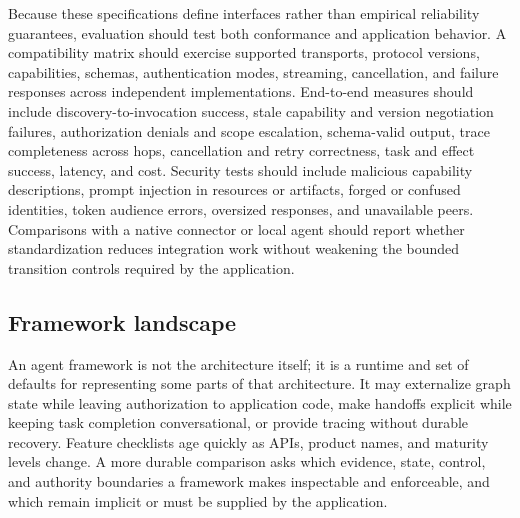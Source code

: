 Because these specifications define interfaces rather than empirical reliability guarantees, evaluation should test both conformance and application behavior. A compatibility matrix should exercise supported transports, protocol versions, capabilities, schemas, authentication modes, streaming, cancellation, and failure responses across independent implementations. End-to-end measures should include discovery-to-invocation success, stale capability and version negotiation failures, authorization denials and scope escalation, schema-valid output, trace completeness across hops, cancellation and retry correctness, task and effect success, latency, and cost. Security tests should include malicious capability descriptions, prompt injection in resources or artifacts, forged or confused identities, token audience errors, oversized responses, and unavailable peers. Comparisons with a native connector or local agent should report whether standardization reduces integration work without weakening the bounded transition controls required by the application.

\subsection{Framework landscape}
\label{sec:frameworks}

An agent framework is not the architecture itself; it is a runtime and set of defaults for representing some parts of that architecture. It may externalize graph state while leaving authorization to application code, make handoffs explicit while keeping task completion conversational, or provide tracing without durable recovery. Feature checklists age quickly as APIs, product names, and maturity levels change. A more durable comparison asks which evidence, state, control, and authority boundaries a framework makes inspectable and enforceable, and which remain implicit or must be supplied by the application.

